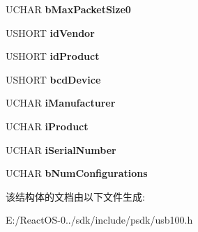 \begin{DoxyCompactItemize}
U\+C\+H\+AR {\bfseries b\+Max\+Packet\+Size0}
\item 
\mbox{\label{struct___u_s_b___d_e_v_i_c_e___d_e_s_c_r_i_p_t_o_r_ae27adcd387e59095576134616db3cad3}} 
U\+S\+H\+O\+RT {\bfseries id\+Vendor}
\item 
\mbox{\label{struct___u_s_b___d_e_v_i_c_e___d_e_s_c_r_i_p_t_o_r_a0acac67b29d57f993f17c5e518f07ba7}} 
U\+S\+H\+O\+RT {\bfseries id\+Product}
\item 
\mbox{\label{struct___u_s_b___d_e_v_i_c_e___d_e_s_c_r_i_p_t_o_r_a75e2c6d6daec47c5d7e7ab5ef2e0ece9}} 
U\+S\+H\+O\+RT {\bfseries bcd\+Device}
\item 
\mbox{\label{struct___u_s_b___d_e_v_i_c_e___d_e_s_c_r_i_p_t_o_r_a5e1b6d5ebc21b73b837123fae3d12daf}} 
U\+C\+H\+AR {\bfseries i\+Manufacturer}
\item 
\mbox{\label{struct___u_s_b___d_e_v_i_c_e___d_e_s_c_r_i_p_t_o_r_ab6c797c5b65f643416cd29f401339f6f}} 
U\+C\+H\+AR {\bfseries i\+Product}
\item 
\mbox{\label{struct___u_s_b___d_e_v_i_c_e___d_e_s_c_r_i_p_t_o_r_aa85e9a9f691e334fa95ecd7ac7d043fa}} 
U\+C\+H\+AR {\bfseries i\+Serial\+Number}
\item 
\mbox{\label{struct___u_s_b___d_e_v_i_c_e___d_e_s_c_r_i_p_t_o_r_a9f806d591c06a8e72c28e7baf3049473}} 
U\+C\+H\+AR {\bfseries b\+Num\+Configurations}
\end{DoxyCompactItemize}


该结构体的文档由以下文件生成\+:\begin{DoxyCompactItemize}
\item 
E\+:/\+React\+O\+S-\/0../sdk/include/psdk/usb100.\+h\end{DoxyCompactItemize}
